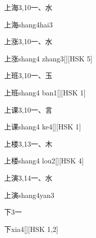 \begin{entry}{上海}{3,10}{⼀、⽔}
  \begin{phonetics}{上海}{shang4hai3}
  \end{phonetics}
\end{entry}

\begin{entry}{上涨}{3,10}{⼀、⽔}
  \begin{phonetics}{上涨}{shang4 zhang3}[][HSK 5]
  \end{phonetics}
\end{entry}

\begin{entry}{上班}{3,10}{⼀、⽟}
  \begin{phonetics}{上班}{shang4 ban1}[][HSK 1]
  \end{phonetics}
\end{entry}

\begin{entry}{上课}{3,10}{⼀、⾔}
  \begin{phonetics}{上课}{shang4 ke4}[][HSK 1]
  \end{phonetics}
\end{entry}

\begin{entry}{上楼}{3,13}{⼀、⽊}
  \begin{phonetics}{上楼}{shang4 lou2}[][HSK 4]
  \end{phonetics}
\end{entry}

\begin{entry}{上演}{3,14}{⼀、⽔}
  \begin{phonetics}{上演}{shang4yan3}
  \end{phonetics}
\end{entry}

\begin{entry}{下}{3}{⼀}
  \begin{phonetics}{下}{xia4}[][HSK 1,2]
  \end{phonetics}
\end{entry}

